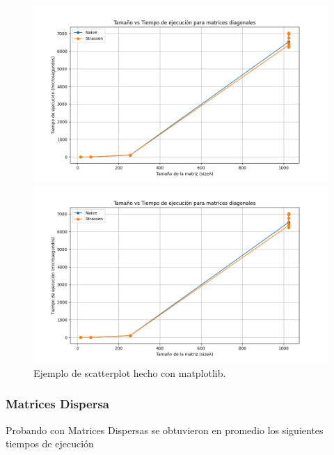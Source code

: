 \begin{figure}[H]
    \centering
    \begin{minipage}[t]{0.5\textwidth}
        \includegraphics[width=\textwidth]{../code/matrix_multiplication/data/plots/diagonal_matrices_plot.png}
    \end{minipage}%
    \begin{minipage}[t]{0.5\textwidth}
        \includegraphics[width=\textwidth]{../code/matrix_multiplication/data/plots/diagonal_matrices_plot.png}
     \end{minipage}%
    \caption{Ejemplo de scatterplot hecho con matplotlib.}
    \label{fig:multi_diagonal}
\end{figure}

\newpage
\subsubsection*{Matrices Dispersa}

Probando con Matrices Dispersas  se obtuvieron en promedio los siguientes tiempos de ejecución

